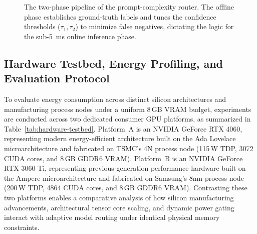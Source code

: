 \documentclass[runningheads]{llncs}
\begin{document}
\begin{figure}[htbp]
{%
}
\caption{The two-phase pipeline of the prompt-complexity router. The offline phase establishes ground-truth labels and tunes the confidence thresholds ($\tau_1, \tau_2$) to minimize false negatives, dictating the logic for the sub-5~ms online inference phase.}
\label{fig:router-pipeline}
\end{figure}

\subsection{Hardware Testbed, Energy Profiling, and Evaluation Protocol}
\label{subsec:experimental-setup}

To evaluate energy consumption across distinct silicon architectures and manufacturing process nodes under a uniform 8\,GB VRAM budget, experiments are conducted across two dedicated consumer GPU platforms, as summarized in Table~\ref{tab:hardware-testbed}. Platform~A is an NVIDIA GeForce RTX 4060, representing modern energy-efficient architecture built on the Ada Lovelace microarchitecture and fabricated on TSMC's 4N process node (115\,W TDP, 3072 CUDA cores, and 8\,GB GDDR6 VRAM). Platform~B is an NVIDIA GeForce RTX 3060 Ti, representing previous-generation performance hardware built on the Ampere microarchitecture and fabricated on Samsung's 8nm process node (200\,W TDP, 4864 CUDA cores, and 8\,GB GDDR6 VRAM). Contrasting these two platforms enables a comparative analysis of how silicon manufacturing advancements, architectural tensor core scaling, and dynamic power gating interact with adaptive model routing under identical physical memory constraints.

\begin{table}[htbp]
\centering
\small
\renewcommand{\arraystretch}{1.2}
\caption{Hardware specifications and architectural characteristics of the evaluation GPU testbed.}
\label{tab:hardware-testbed}
\end{table}
\end{document}
